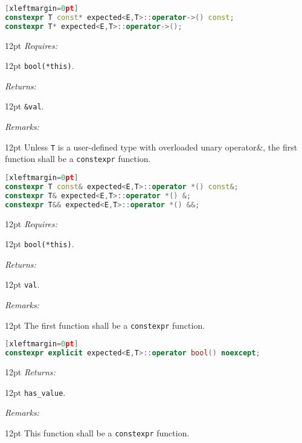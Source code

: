 \documentclass[a4paper,10pt]{article}
\newcommand{\cpp}[1]{\lstinline{#1}}
\newcommand{\wordingItem}[1]{\noindent\textit{#1:}}
\newenvironment{wordingTextItem}[1]{\wordingItem{#1}\vspace{2pt}\noindent\begin{adjustwidth}{12pt}{}}{\vspace{2pt}\end{adjustwidth}}
\newenvironment{wordingPara}{\begin{adjustwidth}{12pt}{}}{\end{adjustwidth}}
\begin{document}
\begin{lstlisting}[language=C++][xleftmargin=0pt]
constexpr T const* expected<E,T>::operator->() const;
constexpr T* expected<E,T>::operator->(); 
\end{lstlisting}
\begin{wordingPara}
\begin{wordingTextItem}{Requires}
\cpp{bool(*this)}.
\end{wordingTextItem}
\begin{wordingTextItem}{Returns}
\cpp{&val}.
\end{wordingTextItem}
\begin{wordingTextItem}{Remarks}
Unless \cpp{T} is a user-defined type with overloaded unary operator\&, the first function shall be a \cpp{constexpr} function.
\end{wordingTextItem}
\end{wordingPara}

\begin{lstlisting}[language=C++][xleftmargin=0pt]
constexpr T const& expected<E,T>::operator *() const&;
constexpr T& expected<E,T>::operator *() &;
constexpr T&& expected<E,T>::operator *() &&;
\end{lstlisting}
\begin{wordingPara}
\begin{wordingTextItem}{Requires}
\cpp{bool(*this)}.
\end{wordingTextItem}
\begin{wordingTextItem}{Returns}
\cpp{val}.
\end{wordingTextItem}
\begin{wordingTextItem}{Remarks}
The first function shall be a \cpp{constexpr} function.
\end{wordingTextItem}
\end{wordingPara}

\begin{lstlisting}[language=C++][xleftmargin=0pt]
constexpr explicit expected<E,T>::operator bool() noexcept; 
\end{lstlisting}
\begin{wordingPara}
\begin{wordingTextItem}{Returns}
\cpp{has_value}.
\end{wordingTextItem}
\begin{wordingTextItem}{Remarks}
This function shall be a \cpp{constexpr} function.
\end{wordingTextItem}
\end{wordingPara}
\end{document}
